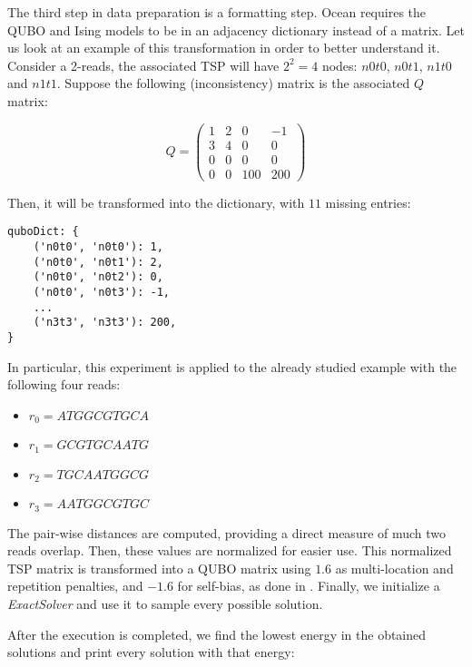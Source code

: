 The third step in data preparation is a formatting step. Ocean requires the QUBO and Ising models to be in an adjacency dictionary instead of a matrix. Let us look at an example of this transformation in order to better understand it. Consider a 2-reads, the associated TSP will have $2^2 = 4$ nodes: $n0t0$, $n0t1$, $n1t0$ and $n1t1$. Suppose the following (inconsistency) matrix is the associated $Q$ matrix:

$$
Q = 
\left(
\begin{array}{cccc}
	1 & 2 & 0 & -1 \\
	3 & 4 & 0 & 0 \\
	0 & 0 & 0 & 0 \\
	0 & 0 & 100 & 200 
\end{array}
\right)
$$

Then, it will be transformed into the dictionary, with $11$ missing entries: 

\begin{verbatim}
quboDict: {
	('n0t0', 'n0t0'): 1,
	('n0t0', 'n0t1'): 2,
	('n0t0', 'n0t2'): 0,
	('n0t0', 'n0t3'): -1,
	...
	('n3t3', 'n3t3'): 200,
}
\end{verbatim}

In particular, this experiment is applied to the already studied example with the following four reads:

\begin{itemize}
	\item $r_0 = ATGGCGTGCA$
	\item $r_1 = GCGTGCAATG$
	\item $r_2 = TGCAATGGCG$
	\item $r_3 = AATGGCGTGC$
\end{itemize}

The pair-wise distances are computed, providing a direct measure of much two reads overlap. Then, these values are normalized for easier use. This normalized TSP matrix is transformed into a QUBO matrix using $1.6$ as multi-location and repetition penalties, and $-1.6$ for self-bias, as done in \cite{Sarkar2020}. Finally, we initialize a \emph{ExactSolver} and use it to sample every possible solution.

After the execution is completed, we find the lowest energy in the obtained solutions and print every solution with that energy:

